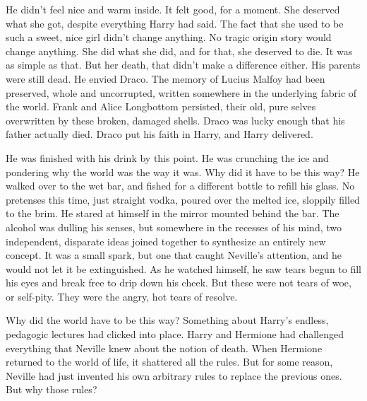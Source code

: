 
He didn’t feel nice and warm inside. It felt good, for a moment. She deserved what she got, despite everything Harry had said. The fact that she used to be such a sweet, nice girl didn’t change anything. No tragic origin story would change anything. She did what she did, and for that, she deserved to die. It was as simple as that. But her death, that didn’t make a difference either.
\SmallVSpace
His parents were still dead.
\SmallVSpace
He envied Draco. The memory of Lucius Malfoy had been preserved, whole and uncorrupted, written somewhere in the underlying fabric of the world. Frank and Alice Longbottom persisted, their old, pure selves overwritten by these broken, damaged shells. Draco was lucky enough that his father actually died. Draco put his faith in Harry, and Harry delivered.


He was finished with his drink by this point. He was crunching the ice and pondering why the world was the way it was. Why did it have to be this way? He walked over to the wet bar, and fished for a different bottle to refill his glass. No pretenses this time, just straight vodka, poured over the melted ice, sloppily filled to the brim. He stared at himself in the mirror mounted behind the bar.
\SmallVSpace
The alcohol was dulling his senses, but somewhere in the recesses of his mind, two independent, disparate ideas joined together to synthesize an entirely new concept. It was a small spark, but one that caught Neville’s attention, and he would not let it be extinguished. As he watched himself, he saw tears begun to fill his eyes and break free to drip down his cheek. But these were not tears of woe, or self-pity. They were the angry, hot tears of resolve.

Why did the world have to be this way?
\SmallVSpace
Something about Harry’s endless, pedagogic lectures had clicked into place. Harry and Hermione had challenged everything that Neville knew about the notion of death. When Hermione returned to the world of life, it shattered all the rules. But for some reason, Neville had just invented his own arbitrary rules to replace the previous ones. But why those rules?

